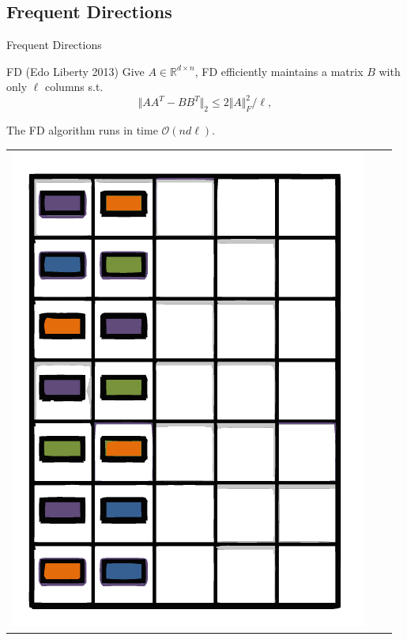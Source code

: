 \documentclass{beamer}
\def\MO{{\mathcal O}}
\def\BR{{\mathbb R}}
\begin{document}
\subsection{Frequent Directions} 

\begin{frame}{Frequent Directions}
\begin{block}{FD (Edo Liberty 2013)}
	Give $A\in \BR^{d\times n}$, FD efficiently maintains a matrix $B$ with only $\ell$ columns s.t. 
 $$\Vert AA^T  - BB^T \Vert_2 \le 2 \Vert A\Vert_F^2/\ell, $$
\end{block}

The FD algorithm runs in time $\MO(nd\ell)$. %
\end{frame}

\begin{frame}
	\begin{center}
		\begin{tabular}{ccc}
			\includegraphics*[scale=0.23]{figures/FD1.pdf} &

\end{tabular}
\end{center}
\end{frame}
\end{document}
